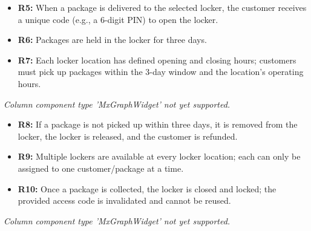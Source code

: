 \noindent
\begin{minipage}[t]{0.48\textwidth}\vspace{0pt}
\begin{itemize}
\item
\textbf{R5:} When a package is delivered to the selected locker, the customer receives a unique code (e.g., a 6-digit PIN) to open the locker.
\item
\textbf{R6:} Packages are held in the locker for three days.
\item
\textbf{R7:} Each locker location has defined opening and closing hours; customers must pick up packages within the 3-day window and the location's operating hours.
\end{itemize}
\end{minipage}
\hfill
\begin{minipage}[t]{0.48\textwidth}\vspace{0pt}
\textit{Column component type 'MxGraphWidget' not yet supported.}
\end{minipage}

\noindent
\begin{minipage}[t]{0.48\textwidth}\vspace{0pt}
\begin{itemize}
\item
\textbf{R8:} If a package is not picked up within three days, it is removed from the locker, the locker is released, and the customer is refunded.
\item
\textbf{R9:} Multiple lockers are available at every locker location; each can only be assigned to one customer/package at a time.
\item
\textbf{R10:} Once a package is collected, the locker is closed and locked; the provided access code is invalidated and cannot be reused.
\end{itemize}
\end{minipage}
\hfill
\begin{minipage}[t]{0.48\textwidth}\vspace{0pt}
\textit{Column component type 'MxGraphWidget' not yet supported.}
\end{minipage}

